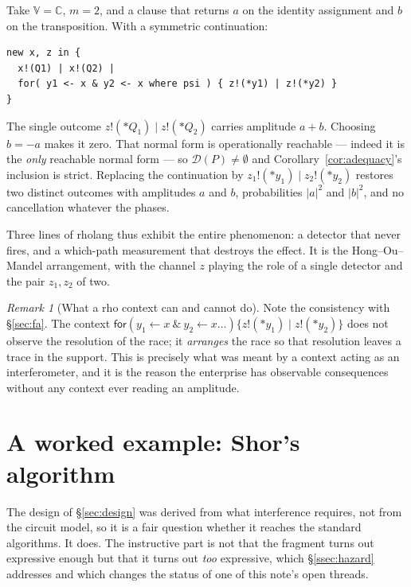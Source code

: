 \documentclass[11pt,a4paper]{article}
\theoremstyle{plain}
\theoremstyle{definition}
\theoremstyle{remark}
\newtheorem{remark}[theorem]{Remark}
\newcommand{\V}{\mathbb{V}}
\newcommand{\Cx}{\mathbb{C}}
\begin{document}
Take $\V = \Cx$, $m = 2$, and a clause that returns $a$ on the identity
assignment and $b$ on the transposition. With a symmetric continuation:

\begin{lstlisting}
new x, z in {
  x!(Q1) | x!(Q2) |
  for( y1 <- x & y2 <- x where psi ) { z!(*y1) | z!(*y2) }
}
\end{lstlisting}

The single outcome $z!(*Q_1) \mid z!(*Q_2)$ carries amplitude $a + b$. Choosing
$b = -a$ makes it zero. That normal form is operationally reachable --- indeed it
is the \emph{only} reachable normal form --- so
$\mathcal{D}(P) \neq \emptyset$ and Corollary~\ref{cor:adequacy}'s inclusion is
strict. Replacing the continuation by $z_1!(*y_1) \mid z_2!(*y_2)$ restores two
distinct outcomes with amplitudes $a$ and $b$, probabilities $|a|^2$ and $|b|^2$,
and no cancellation whatever the phases.

Three lines of rholang thus exhibit the entire phenomenon: a detector that never
fires, and a which-path measurement that destroys the effect. It is the
Hong--Ou--Mandel arrangement, with the channel $z$ playing the role of a single
detector and the pair $z_1,z_2$ of two.

\begin{remark}[What a rho context can and cannot do]\label{rem:back-to-fa}
Note the consistency with \S\ref{sec:fa}. The context
$\textsf{for}(y_1 \leftarrow x\ \&\ y_2 \leftarrow x \dots)\{z!(*y_1)\mid z!(*y_2)\}$
does not observe the resolution of the race; it \emph{arranges} the race so that
resolution leaves a trace in the support. This is precisely what was meant by a
context acting as an interferometer, and it is the reason the enterprise has
observable consequences without any context ever reading an amplitude.
\end{remark}

\section{A worked example: Shor's algorithm}\label{sec:shor}

The design of \S\ref{sec:design} was derived from what interference requires,
not from the circuit model, so it is a fair question whether it reaches the
standard algorithms. It does. The instructive part is not that the fragment turns
out expressive enough but that it turns out \emph{too} expressive, which
\S\ref{ssec:hazard} addresses and which changes the status of one of this note's
open threads.
\end{document}
